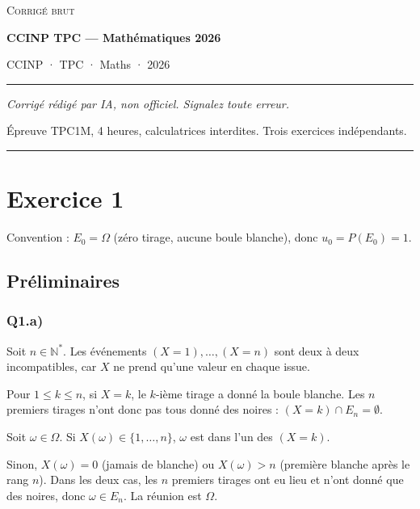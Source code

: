 \documentclass[11pt,a4paper]{article}
\providecommand{\varnothing}{\emptyset}
\begin{document}
\thispagestyle{plain}
\begin{center}
  {\small\scshape Corrigé brut}\par\smallskip
  {\LARGE\bfseries CCINP TPC — Mathématiques 2026\par}\medskip
  {\large CCINP · TPC · Maths · 2026\par}
\end{center}
\vspace{2pt}\hrule\vspace{8pt}

\emph{Corrigé rédigé par IA, non officiel. Signalez toute erreur.}

Épreuve TPC1M, 4 heures, calculatrices interdites. Trois exercices indépendants.

\begin{center}\rule{0.5\linewidth}{0.5pt}\end{center}

\hypertarget{exercice-1}{%
\section{Exercice 1}\label{exercice-1}}

Convention : \(E_0=\Omega\) (zéro tirage, aucune boule blanche), donc \(u_0=P(E_0)=1\).

\hypertarget{pruxe9liminaires}{%
\subsection{Préliminaires}\label{pruxe9liminaires}}

\hypertarget{q1.a}{%
\subsubsection{Q1.a)}\label{q1.a}}

Soit \(n\in\mathbb N^*\). Les événements \((X=1),\dots,(X=n)\) sont deux à deux incompatibles, car \(X\) ne prend qu'une valeur en chaque issue.

Pour \(1\le k\le n\), si \(X=k\), le \(k\)-ième tirage a donné la boule blanche. Les \(n\) premiers tirages n'ont donc pas tous donné des noires : \((X=k)\cap E_n=\varnothing\).

Soit \(\omega\in\Omega\). Si \(X(\omega)\in\{1,\dots,n\}\), \(\omega\) est dans l'un des \((X=k)\).

Sinon, \(X(\omega)=0\) (jamais de blanche) ou \(X(\omega)>n\) (première blanche après le rang \(n\)). Dans les deux cas, les \(n\) premiers tirages ont eu lieu et n'ont donné que des noires, donc \(\omega\in E_n\). La réunion est \(\Omega\).
\end{document}
